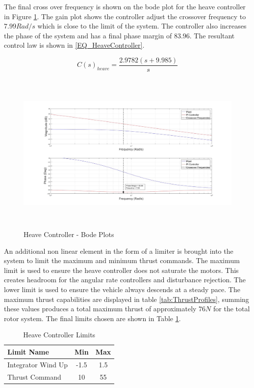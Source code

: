 	 The final cross over frequency is shown on the bode plot for the heave controller in Figure \ref{IM_HeaveControlBode}. The gain plot shows the controller adjust the crossover frequency to $7.99 Rad/s$ which is close to the limit of the system. The controller also increases the phase of the system and has a final phase margin of $83.96$\textdegree. The resultant control law is shown in \eqref{EQ_HeaveController}.
	 
	 \begin{equation}
	 \label{EQ_HeaveController}
	 C(s)_{heave} = \frac{2.9782 (s + 9.985)}{s}
	 \end{equation}		
	 
	 \begin{figure}[H]
	 	\centering
	 	\includegraphics[height = 8cm]{../Design/Matlab/Controllers/heave_bode.jpg}
	 	\caption{Heave Controller -  Bode Plots}
	 	\label{IM_HeaveControlBode}
	 \end{figure}
	 
	 An additional non linear element in the form of a limiter is brought into the system to limit the maximum and minimum thrust commands. The maximum limit is used to ensure the heave controller does not saturate the motors. This creates headroom for the angular rate controllers and disturbance rejection. The lower limit is used to ensure the vehicle always descends at a steady pace. The maximum thrust capabilities are displayed in table \ref{tab:ThrustProfiles}, summing these values produces a total maximum thrust of approximately $76N$ for the total rotor system. The final limits chosen are shown in Table \ref{tab:HeaveLimits}.
	 
	 \begin{table}[!]
	 	\centering
	 	\begin{tabular}{l | c | c |}
	 		Limit Name 				& Min & Max\\
	 		\hline\hline
	 		Integrator Wind Up 	   	& -1.5 	& 1.5 \\
	 		Thrust Command 		    & 10	& 55 \\
	 	\end{tabular}
	 	\caption{Heave Controller Limits}
	 	\label{tab:HeaveLimits}
	 \end{table}
	 
